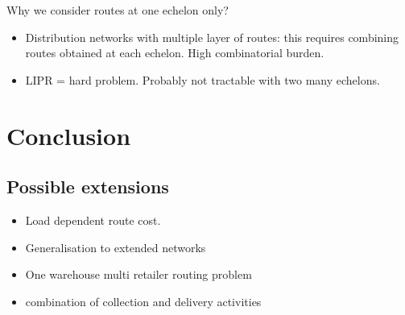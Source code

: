 \documentclass[a4paper,10pt]{article}
\begin{document}
\begin{linenumbers}
 
 Why we consider routes at one echelon only? 
 \begin{itemize}
 	\item Distribution networks with multiple layer of routes: this requires combining routes obtained at each echelon. High combinatorial burden. 
	\item LIPR = hard problem. Probably not tractable with two many echelons. 
 \end{itemize}

\section{Conclusion}



\subsection*{Possible extensions}
\begin{itemize}
	\item Load dependent route cost. 
	\item Generalisation to extended networks
	\item One warehouse multi retailer routing problem
	\item combination of collection and delivery activities
	
\end{itemize}


\end{linenumbers}

\newpage
%


\end{document}
